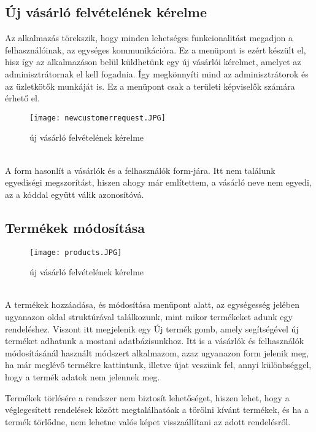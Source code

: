 \subsection{Új vásárló felvételének kérelme}
Az alkalmazás törekszik, hogy minden lehetséges funkcionalitást megadjon a felhasználóinak, az egységes kommunikációra. Ez a menüpont is ezért készült el, hisz így az alkalmazáson belül küldhetünk egy új vásárlói kérelmet, amelyet az adminisztrátornak el kell fogadnia. Így megkönnyíti mind az adminisztrátorok és az üzletkötők munkáját is. Ez a menüpont csak a területi képviselők számára érhető el.
\begin{figure}[h]
    \centering
    \texttt{[image: newcustomerrequest.JPG]}
    \caption{új vásárló felvételének kérelme}
\end{figure}\\
A form hasonlít a vásárlók és a felhasználók form-jára. Itt nem találunk egyediségi megszorítást, hiszen ahogy már említettem, a vásárló neve nem egyedi, az a kóddal együtt válik azonosítóvá.
\newpage
\subsection{Termékek módosítása}
\begin{figure}[h]
    \centering
    \texttt{[image: products.JPG]}
    \caption{új vásárló felvételének kérelme}
\end{figure}\\
A termékek hozzáadása, és módosítása menüpont alatt, az egységesség jelében ugyanazon oldal struktúrával találkozunk, mint mikor termékeket adunk egy rendeléshez. Viszont itt megjelenik egy Új termék gomb, amely segítségével új terméket adhatunk a mostani adatbázisunkhoz. Itt is a vásárlók és felhasználók módosításánál használt módszert alkalmazom, azaz ugyanazon form jelenik meg, ha már meglévő termékre kattintunk, illetve újat veszünk fel, annyi különbséggel, hogy a termék adatok nem jelennek meg. 

Termékek törlésére a rendszer nem biztosít lehetőséget, hiszen lehet, hogy a véglegesített rendelések között megtalálhatóak a törölni kívánt termékek, és ha a termék törlődne, nem lehetne valós képet visszaállítani az adott rendelésről.
\newpage
